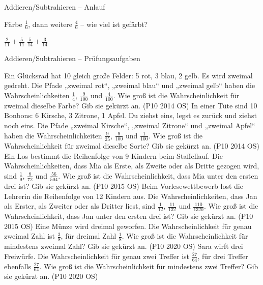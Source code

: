 \setcounter{aufgabe}{0}

\begin{aufgabe}{Addieren/Subtrahieren – Anlauf}
\begin{teile}
\teil Färbe $\frac{1}{6}$, dann weitere $\frac{4}{6}$ – wie viel ist gefärbt?

\leerfeld
\teil $\frac{2}{11} + \frac{5}{11}$
\teil $\frac{5}{14} + \frac{3}{14}$
\end{teile}
\end{aufgabe}

\begin{aufgabe}{Addieren/Subtrahieren – Prüfungsaufgaben}
\begin{teile}
\steil Ein Glücksrad hat 10 gleich große Felder: 5 rot, 3 blau, 2 gelb. Es wird zweimal gedreht. Die Pfade „zweimal rot“, „zweimal blau“ und „zweimal gelb“ haben die Wahrscheinlichkeiten $\frac{1}{4}$, $\frac{9}{100}$ und $\frac{4}{100}$. Wie groß ist die Wahrscheinlichkeit für zweimal dieselbe Farbe? Gib sie gekürzt an. \hfill (P10 2014 OS)
\steil In einer Tüte sind 10 Bonbons: 6 Kirsche, 3 Zitrone, 1 Apfel. Du ziehst eins, legst es zurück und ziehst noch eins. Die Pfade „zweimal Kirsche“, „zweimal Zitrone“ und „zweimal Apfel“ haben die Wahrscheinlichkeiten $\frac{9}{25}$, $\frac{9}{100}$ und $\frac{1}{100}$. Wie groß ist die Wahrscheinlichkeit für zweimal dieselbe Sorte? Gib sie gekürzt an. \hfill (P10 2014 OS)
\steil Ein Los bestimmt die Reihenfolge von 9 Kindern beim Staffellauf. Die Wahrscheinlichkeiten, dass Mia als Erste, als Zweite oder als Dritte gezogen wird, sind $\frac{1}{9}$, $\frac{8}{72}$ und $\frac{56}{504}$. Wie groß ist die Wahrscheinlichkeit, dass Mia unter den ersten drei ist? Gib sie gekürzt an. \hfill (P10 2015 OS)
\steil Beim Vorlesewettbewerb lost die Lehrerin die Reihenfolge von 12 Kindern aus. Die Wahrscheinlichkeiten, dass Jan als Erster, als Zweiter oder als Dritter liest, sind $\frac{1}{12}$, $\frac{11}{132}$ und $\frac{110}{1320}$. Wie groß ist die Wahrscheinlichkeit, dass Jan unter den ersten drei ist? Gib sie gekürzt an. \hfill (P10 2015 OS)
\steil Eine Münze wird dreimal geworfen. Die Wahrscheinlichkeit für genau zweimal Zahl ist $\frac{3}{8}$, für dreimal Zahl $\frac{1}{8}$. Wie groß ist die Wahrscheinlichkeit für mindestens zweimal Zahl? Gib sie gekürzt an. \hfill (P10 2020 OS)
\steil Sara wirft drei Freiwürfe. Die Wahrscheinlichkeit für genau zwei Treffer ist $\frac{27}{64}$, für drei Treffer ebenfalls $\frac{27}{64}$. Wie groß ist die Wahrscheinlichkeit für mindestens zwei Treffer? Gib sie gekürzt an. \hfill (P10 2020 OS)

\end{teile}
\end{aufgabe}
